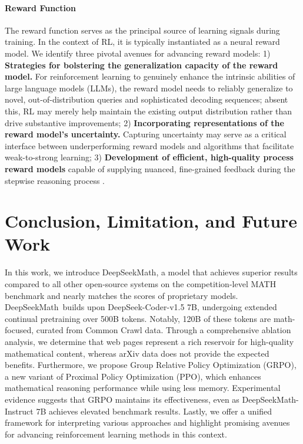 \begin{itemize}[topsep=0pt]
\paragraph{Reward Function} The reward function serves as the principal source of learning signals during training. In the context of RL, it is typically instantiated as a neural reward model. We identify three pivotal avenues for advancing reward models: 1) \textbf{Strategies for bolstering the generalization capacity of the reward model.} For reinforcement learning to genuinely enhance the intrinsic abilities of large language models (LLMs), the reward model needs to reliably generalize to novel, out-of-distribution queries and sophisticated decoding sequences; absent this, RL may merely help maintain the existing output distribution rather than drive substantive improvements; 2) \textbf{Incorporating representations of the reward model's uncertainty.} Capturing uncertainty may serve as a critical interface between underperforming reward models and algorithms that facilitate weak-to-strong learning; 3) \textbf{Development of efficient, high-quality process reward models} capable of supplying nuanced, fine-grained feedback during the stepwise reasoning process \citep{lightman2023let,wang2023math}.

\section{Conclusion, Limitation, and Future Work}

In this work, we introduce DeepSeekMath, a model that achieves superior results compared to all other open-source systems on the competition-level MATH benchmark and nearly matches the scores of proprietary models. DeepSeekMath~builds upon DeepSeek-Coder-v1.5 7B, undergoing extended continual pretraining over 500B tokens. Notably, 120B of these tokens are math-focused, curated from Common Crawl data. Through a comprehensive ablation analysis, we determine that web pages represent a rich reservoir for high-quality mathematical content, whereas arXiv data does not provide the expected benefits. Furthermore, we propose Group Relative Policy Optimization (GRPO), a new variant of Proximal Policy Optimization (PPO), which enhances mathematical reasoning performance while using less memory. Experimental evidence suggests that GRPO maintains its effectiveness, even as DeepSeekMath-Instruct 7B achieves elevated benchmark results. Lastly, we offer a unified framework for interpreting various approaches and highlight promising avenues for advancing reinforcement learning methods in this context.


\end{itemize}
